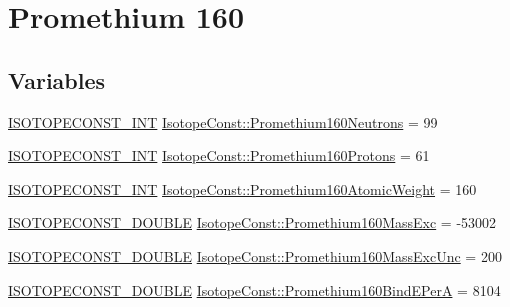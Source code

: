 \hypertarget{group___isotope_const-_promethium-_pm160}{}\section{Promethium 160}
\label{group___isotope_const-_promethium-_pm160}
\subsection*{Variables}
\begin{DoxyCompactItemize}
\item 
\mbox{\hyperlink{group___isotope_const-_macros_ga5f18360b3e99483a35c32d789e62621c}{I\+S\+O\+T\+O\+P\+E\+C\+O\+N\+S\+T\+\_\+\+I\+NT}} \mbox{\hyperlink{group___isotope_const-_promethium-_pm160_ga1abfa58d0ffaa00226fa84725a278a0b}{Isotope\+Const\+::\+Promethium160\+Neutrons}} = 99
\item 
\mbox{\hyperlink{group___isotope_const-_macros_ga5f18360b3e99483a35c32d789e62621c}{I\+S\+O\+T\+O\+P\+E\+C\+O\+N\+S\+T\+\_\+\+I\+NT}} \mbox{\hyperlink{group___isotope_const-_promethium-_pm160_gaf5b260a0794faef2bc6ed622e1c646a5}{Isotope\+Const\+::\+Promethium160\+Protons}} = 61
\item 
\mbox{\hyperlink{group___isotope_const-_macros_ga5f18360b3e99483a35c32d789e62621c}{I\+S\+O\+T\+O\+P\+E\+C\+O\+N\+S\+T\+\_\+\+I\+NT}} \mbox{\hyperlink{group___isotope_const-_promethium-_pm160_ga73cf0883eec6d0e695645b14fb930332}{Isotope\+Const\+::\+Promethium160\+Atomic\+Weight}} = 160
\item 
\mbox{\hyperlink{group___isotope_const-_macros_ga8f45a7272ce02c0b4c65c44636ed719a}{I\+S\+O\+T\+O\+P\+E\+C\+O\+N\+S\+T\+\_\+\+D\+O\+U\+B\+LE}} \mbox{\hyperlink{group___isotope_const-_promethium-_pm160_ga92a205bf7d2b52947ed3cfc4440dbb86}{Isotope\+Const\+::\+Promethium160\+Mass\+Exc}} = -\/53002
\item 
\mbox{\hyperlink{group___isotope_const-_macros_ga8f45a7272ce02c0b4c65c44636ed719a}{I\+S\+O\+T\+O\+P\+E\+C\+O\+N\+S\+T\+\_\+\+D\+O\+U\+B\+LE}} \mbox{\hyperlink{group___isotope_const-_promethium-_pm160_gacf1e4e32385a68de7ab2d12b0232c3b8}{Isotope\+Const\+::\+Promethium160\+Mass\+Exc\+Unc}} = 200
\item 
\mbox{\hyperlink{group___isotope_const-_macros_ga8f45a7272ce02c0b4c65c44636ed719a}{I\+S\+O\+T\+O\+P\+E\+C\+O\+N\+S\+T\+\_\+\+D\+O\+U\+B\+LE}} \mbox{\hyperlink{group___isotope_const-_promethium-_pm160_ga89f91903ec60ec696605c807ff966181}{Isotope\+Const\+::\+Promethium160\+Bind\+E\+PerA}} = 8104
\item 

\end{DoxyCompactItemize}
